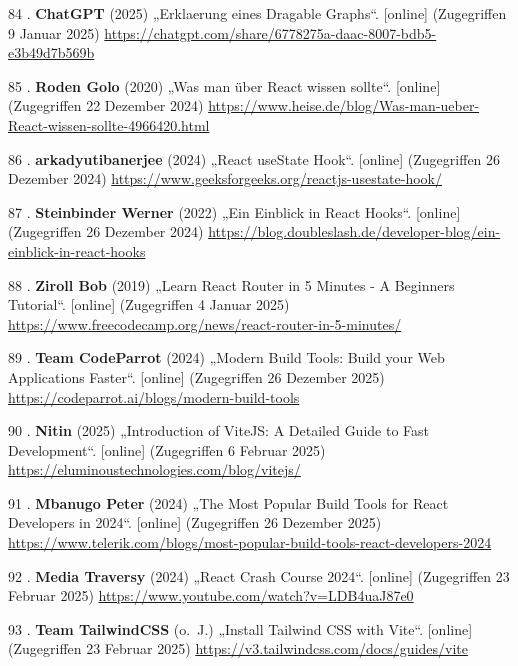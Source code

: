 \documentclass[
    headings=optiontotocandhead,%
    twoside,
    numbers=noenddot,%
    12pt, %
    titlepage, %
    parskip=full, %
    listof=leveldown, 
    numbers=noenddot, %
    a4paper,DIV=14,
    BCOR=15mm,
]{scrbook}
\newlength{\cslhangindent}
\newenvironment{cslreferences}%
  {\setlength{\parindent}{0pt}%
  \everypar{\setlength{\hangindent}{\cslhangindent}}\ignorespaces}%
  {\par}
\begin{document}
\begin{cslreferences}
\leavevmode\hypertarget{ref-gpt-DragableGraph}{}%
84 . \textbf{ChatGPT} (2025) „Erklaerung eines Dragable Graphs``.
{[}online{]} (Zugegriffen 9 Januar 2025)
\url{https://chatgpt.com/share/6778275a-daac-8007-bdb5-e3b49d7b569b}

\leavevmode\hypertarget{ref-Heise-React}{}%
85 . \textbf{Roden Golo} (2020) „Was man über React wissen sollte``.
{[}online{]} (Zugegriffen 22 Dezember 2024)
\url{https://www.heise.de/blog/Was-man-ueber-React-wissen-sollte-4966420.html}

\leavevmode\hypertarget{ref-GeeksForGeeks-useState}{}%
86 . \textbf{arkadyutibanerjee} (2024) „React useState Hook``.
{[}online{]} (Zugegriffen 26 Dezember 2024)
\url{https://www.geeksforgeeks.org/reactjs-usestate-hook/}

\leavevmode\hypertarget{ref-DoubleSlash-ReactHooks}{}%
87 . \textbf{Steinbinder Werner} (2022) „Ein Einblick in React Hooks``.
{[}online{]} (Zugegriffen 26 Dezember 2024)
\url{https://blog.doubleslash.de/developer-blog/ein-einblick-in-react-hooks}

\leavevmode\hypertarget{ref-FreeCodeCamp-Routing}{}%
88 . \textbf{Ziroll Bob} (2019) „Learn React Router in 5 Minutes - A
Beginners Tutorial``. {[}online{]} (Zugegriffen 4 Januar 2025)
\url{https://www.freecodecamp.org/news/react-router-in-5-minutes/}

\leavevmode\hypertarget{ref-CodeParrot-BuildTools}{}%
89 . \textbf{Team CodeParrot} (2024) „Modern Build Tools: Build your Web
Applications Faster``. {[}online{]} (Zugegriffen 26 Dezember 2025)
\url{https://codeparrot.ai/blogs/modern-build-tools}

\leavevmode\hypertarget{ref-eluminoustechnologies-vite}{}%
90 . \textbf{Nitin} (2025) „Introduction of ViteJS: A Detailed Guide to
Fast Development``. {[}online{]} (Zugegriffen 6 Februar 2025)
\url{https://eluminoustechnologies.com/blog/vitejs/}

\leavevmode\hypertarget{ref-Telerik-BuildTools}{}%
91 . \textbf{Mbanugo Peter} (2024) „The Most Popular Build Tools for
React Developers in 2024``. {[}online{]} (Zugegriffen 26 Dezember 2025)
\url{https://www.telerik.com/blogs/most-popular-build-tools-react-developers-2024}

\leavevmode\hypertarget{ref-React-CrashCourse}{}%
92 . \textbf{Media Traversy} (2024) „React Crash Course 2024``.
{[}online{]} (Zugegriffen 23 Februar 2025)
\url{https://www.youtube.com/watch?v=LDB4uaJ87e0}

\leavevmode\hypertarget{ref-TailwindCSS-Docs-ViteSetup}{}%
93 . \textbf{Team TailwindCSS} (o.~J.) „Install Tailwind CSS with
Vite``. {[}online{]} (Zugegriffen 23 Februar 2025)
\url{https://v3.tailwindcss.com/docs/guides/vite}


\end{cslreferences}
\end{document}
